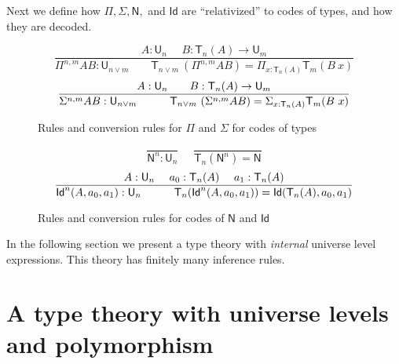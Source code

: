 \documentclass[11pt,a4paper]{article}
\theoremstyle{definition}
\newcommand{\Id}{\mathsf{Id}}
\newcommand{\NN}{\mathsf{N}}
\newcommand{\UU}{\mathsf{U}}
\newcommand{\mylam}[3]{\lambda_{#1:#2}#3}
\newcommand{\mypi}[3]{\Pi_{#1:#2}#3}
\newcommand{\mysig}[3]{\Sigma_{#1:#2}#3}
\newcommand{\sapp}[2]{{#1(#2)}} %
\newcommand{\Idapp}[3]{\sapp{\Id}{#1,#2,#3}}
\newcommand{\Idnapp}[4]{\sapp{\Id^#4}{#1,#2,#3}}
\newcommand{\T}{\mathsf{T}}
\begin{document}
Next we define how $\Pi, \Sigma, \NN,$ and $\Id$ are ``relativized'' to
codes of types, and how they are decoded.

\begin{figure}[H]
  \caption{Rules and conversion rules for $\Pi$ and $\Sigma$ for codes of types}\label{fig:PiSigU}
$$
\frac{A:\UU_{n}~~~~~~B:\T_{n}(A)\rightarrow \UU_{m}}
     {\Pi^{n,m} A B:\UU_{n\vee m}~~~~~~~~~
      \T_{n\vee m}~(\Pi^{n,m} A B) = \mypi{x}{\T_{n}(A)}{ \T_{m}(B~x)}}
$$
$$
\frac{A:\UU_{n}~~~~~~B:\T_{n}(A)\rightarrow \UU_{m}}
     {\Sigma^{n,m} A B:\UU_{n\vee m}~~~~~~~~~
     \T_{n\vee m}~(\Sigma^{n,m} A B) = \mysig {x}{\T_{n}(A)}{ \T_{m}(B~x)}}
\belowdisplayshortskip -1pt
$$
\end{figure}

\begin{figure}[H]
\caption{Rules and conversion rules for codes of $\NN$ and $\Id$}\label{fig:NIdU}
$$
\frac{}{\NN^{n}:\UU_{n}}~~~~~~\frac{}{\T_{n}(\NN^{n}) = \NN}
$$
$$
\frac{A:\UU_n~~~~a_0:\T_n(A)~~~~a_1:\T_n(A)}
{\Idnapp{A}{a_0}{a_1}{n}:\UU_n ~~~~~~~~~ \T_n(\Idnapp{A}{a_0}{a_1}{n}) = \Idapp{{\T_n(A)}}{a_0}{a_1} }
\belowdisplayshortskip 1pt
$$
\end{figure}



In the following section we present a type theory with \emph{internal}
universe level expressions. This theory has finitely many inference rules.

 \section{A type theory with universe levels and polymorphism }\label{sec:internal}
\end{document}
